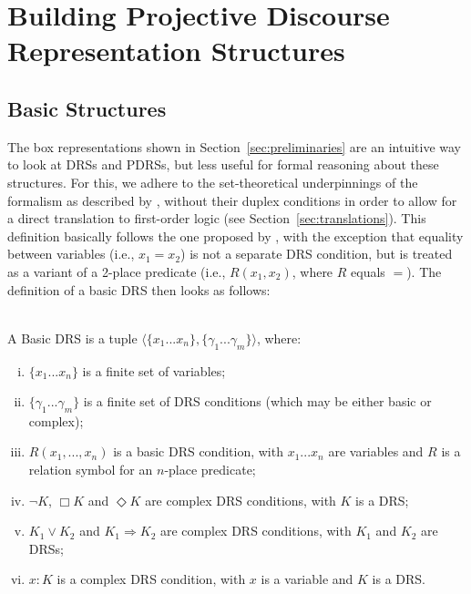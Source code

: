 \section{Building Projective Discourse Representation Structures}
\label{sec:building}


\subsection{Basic Structures}

The box representations shown in Section~\ref{sec:preliminaries} are an
intuitive way to look at DRSs and PDRSs, but less useful for formal
reasoning about these structures. For this, we adhere to the set-theoretical
underpinnings of the formalism as described by
, without their duplex conditions in order to
allow for a direct translation to first-order logic (see
Section~\ref{sec:translations}). This definition basically follows the one
proposed by , with the exception that
equality between variables (i.e., $x_1=x_2$) is not a separate DRS
condition, but is treated as a variant of a 2-place predicate (i.e.,
$R(x_1,x_2)$, where $R$ equals $=$). The definition of a basic DRS then
looks as follows:

\begin{definition} \label{def:bDRS}~\\
A Basic DRS is a tuple $\langle \{x_1 ... x_n\},\{\gamma_1 ... \gamma_m\} 
\rangle$, where:
 \begin{enumerate}[i.]
  \item $\{x_1 ... x_n\}$ is a finite set of variables;
  \item $\{\gamma_1 ... \gamma_m\}$ is a finite set of DRS conditions (which
    may be either basic or complex);
  \item\label{def:bDRS:Rel} $R(x_1, ..., x_n)$ is a basic DRS condition,
    with $x_1 ... x_n$ are variables and $R$ is a relation symbol for an
    $n$-place predicate;
  \item $\neg K$, $\Box K$ and $\Diamond K$ are complex DRS conditions, with
    $K$ is a DRS;
  \item $K_1 \vee K_2$ and $K_1 \Rightarrow K_2$ are complex DRS conditions,
    with $K_1$ and $K_2$ are DRSs;
  \item \label{def:bDRS:Prop} $x:K$ is a complex DRS condition, with $x$ is
    a variable and $K$ is a DRS.
 \end{enumerate} 
\end{definition}

